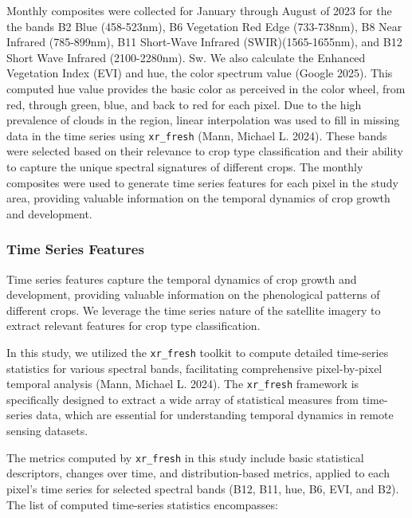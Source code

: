 \documentclass[
  journal,
  twocolumn]{IEEEtran}
\begin{document}
Monthly composites were collected for January through August of 2023 for
the the bands B2 Blue (458-523nm), B6 Vegetation Red Edge (733-738nm),
B8 Near Infrared (785-899nm), B11 Short-Wave Infrared
(SWIR)(1565-1655nm), and B12 Short Wave Infrared (2100-2280nm). Sw. We
also calculate the Enhanced Vegetation Index (EVI) and hue, the color
spectrum value (Google 2025). This computed hue value provides the basic
color as perceived in the color wheel, from red, through green, blue,
and back to red for each pixel. Due to the high prevalence of clouds in
the region, linear interpolation was used to fill in missing data in the
time series using \texttt{xr\_fresh} (Mann, Michael L. 2024). These
bands were selected based on their relevance to crop type classification
and their ability to capture the unique spectral signatures of different
crops. The monthly composites were used to generate time series features
for each pixel in the study area, providing valuable information on the
temporal dynamics of crop growth and development.

\hypertarget{time-series-features}{%
\subsubsection{Time Series Features}\label{time-series-features}}

Time series features capture the temporal dynamics of crop growth and
development, providing valuable information on the phenological patterns
of different crops. We leverage the time series nature of the satellite
imagery to extract relevant features for crop type classification.

In this study, we utilized the \texttt{xr\_fresh} toolkit to compute
detailed time-series statistics for various spectral bands, facilitating
comprehensive pixel-by-pixel temporal analysis (Mann, Michael L. 2024).
The \texttt{xr\_fresh} framework is specifically designed to extract a
wide array of statistical measures from time-series data, which are
essential for understanding temporal dynamics in remote sensing
datasets.

The metrics computed by \texttt{xr\_fresh} in this study include basic
statistical descriptors, changes over time, and distribution-based
metrics, applied to each pixel's time series for selected spectral bands
(B12, B11, hue, B6, EVI, and B2). The list of computed time-series
statistics encompasses:
\end{document}
